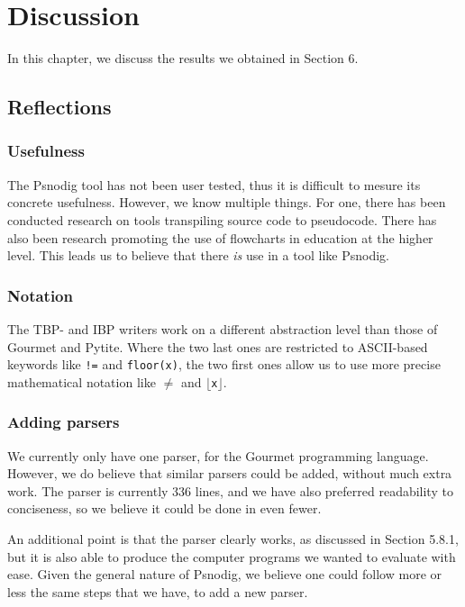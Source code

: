 \chapter{Discussion}

In this chapter, we discuss the results we obtained in Section 6.

\section{Reflections}

\subsection{Usefulness}

The Psnodig tool has not been user tested, thus it is difficult to mesure its concrete usefulness. However, we know multiple things. For one, there has been conducted research on tools transpiling source code to pseudocode. There has also been research promoting the use of flowcharts in education at the higher level. This leads us to believe that there \textit{is} use in a tool like Psnodig.

\subsection{Notation}

The TBP- and IBP writers work on a different abstraction level than those of Gourmet and Pytite. Where the two last ones are restricted to ASCII-based keywords like \texttt{!=} and \texttt{floor(x)}, the two first ones allow us to use more precise mathematical notation like \texttt{$\neq$} and \texttt{$\lfloor$x$\rfloor$}.

\subsection{Adding parsers}

We currently only have one parser, for the Gourmet programming language. However, we do believe that similar parsers could be added, without much extra work. The parser is currently 336 lines, and we have also preferred readability to conciseness, so we believe it could be done in even fewer. \\


An additional point is that the parser clearly works, as discussed in Section 5.8.1, but it is also able to produce the computer programs we wanted to evaluate with ease. Given the general nature of Psnodig, we believe one could follow more or less the same steps that we have, to add a new parser.

